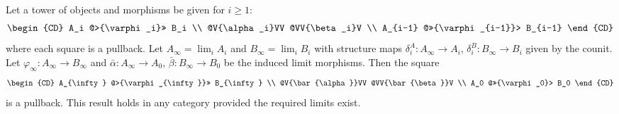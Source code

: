 Let a tower of objects and morphisms be given for $i \geq 1$:
$$
\begin{CD}
A_i @>{\varphi_i}>> B_i \\
@V{\alpha_i}VV @VV{\beta_i}V \\
A_{i-1} @>>{\varphi_{i-1}}> B_{i-1}
\end{CD}
$$
where each square is a pullback. Let $A_{\infty} = \lim_i A_i$ and $B_{\infty} = \lim_i B_i$ with structure maps $\delta_i^A : A_{\infty} \rightarrow A_i$, $\delta_i^B : B_{\infty} \rightarrow B_i$ given by the counit. Let $\varphi_{\infty} : A_{\infty} \rightarrow B_{\infty}$ and $\bar{\alpha} : A_{\infty} \rightarrow A_0$, $\bar{\beta} : B_{\infty} \rightarrow B_0$ be the induced limit morphisms. Then the square
$$
\begin{CD}
A_{\infty} @>{\varphi_{\infty}}>> B_{\infty} \\
@V{\bar{\alpha}}VV @VV{\bar{\beta}}V \\
A_0 @>>{\varphi_0}> B_0
\end{CD}
$$
is a pullback. This result holds in any category provided the required limits exist.
